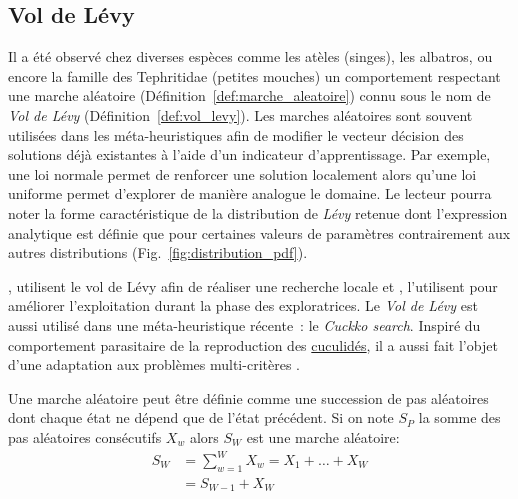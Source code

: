 \subsection{Vol de Lévy} %
\label{sub:vol_de_levy}
Il a été observé chez diverses espèces comme les atèles (singes), les albatros,
ou encore la famille des Tephritidae (petites mouches) un comportement respectant
une marche aléatoire (Définition~\ref{def:marche_aleatoire}) connu sous le nom de
\textit{Vol de Lévy} (Définition~\ref{def:vol_levy}).
Les marches aléatoires sont souvent utilisées dans les méta-heuristiques afin de modifier
le vecteur décision des solutions déjà existantes à l’aide d’un indicateur d’apprentissage.
Par exemple, une loi normale permet de renforcer une solution localement alors qu’une loi
uniforme permet d’explorer de manière analogue le domaine. Le lecteur pourra noter la
forme caractéristique de la distribution de \textit{Lévy} retenue dont l’expression
analytique est définie que pour certaines valeurs de paramètres contrairement aux autres
distributions (Fig.~\ref{fig:distribution_pdf}).

\textcite{Sharma2012213}, utilisent le vol de Lévy afin de réaliser une recherche locale et
\textcite{Hakli2013254}, l’utilisent pour améliorer l’exploitation durant la phase des
exploratrices. Le \textit{Vol de Lévy} est aussi utilisé dans une méta-heuristique
récente~: le
\textit{Cuckko search}. Inspiré du comportement parasitaire de la reproduction des \href{https://fr.wikipedia.org/wiki/Cuculidae}{cuculidés}, il a
aussi fait l’objet d’une adaptation aux problèmes multi-critères \parencite{Yang20131616}.

\begin{Def}\label{def:marche_aleatoire}
Une marche aléatoire \parencite{Yang201445} peut être définie comme une succession de pas
aléatoires dont chaque état ne dépend que de l’état précédent. Si on note $S_{P}$
la somme des pas aléatoires consécutifs $X_{w}$ alors $S_{W}$ est une marche aléatoire:
\begin{equation}\label{eq:marche_aleatoire}
    \begin{split}
        S_{W} &= \sum_{w=1}^{W} X_{w} = X_{1} + \dots + X_{W}\\
              &= S_{W-1} + X_{W}
    \end{split}
\end{equation}
\end{Def}

